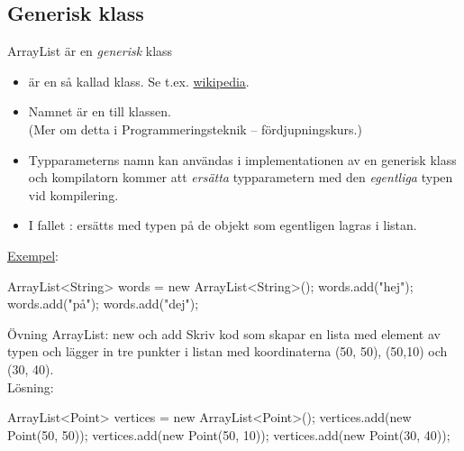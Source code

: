 \documentclass{lecturenotes}
\begin{document}
\subsection{Generisk klass}
\begin{Slide}{ArrayList är en \emph{generisk} klass}\footnotesize
\begin{itemize}
\item {} är en så kallad   klass. Se t.ex. \href{https://en.wikipedia.org/wiki/Generics_in_Java}{wikipedia}.
\item Namnet  är en  till klassen. \\(Mer om detta i Programmeringsteknik – fördjupningskurs.)
\item Typparameterns namn kan användas i implementationen av en generisk klass och kompilatorn kommer att \emph{ersätta} typparametern med den \emph{egentliga} typen vid kompilering.
\item I fallet :  ersätts med typen på de objekt som egentligen lagras i listan.  
\end{itemize}
\href{https://github.com/bjornregnell/lth-eda016-2015/blob/master/lectures/examples/eclipse-ws/lecture-examples/src/week10/generics/TestGenerics.java}{Exempel}:
\begin{Code}[numberstyle=]
        ArrayList<String> words = new ArrayList<String>();
        words.add("hej");
        words.add("på");
        words.add("dej");
\end{Code}
\end{Slide}

\begin{Slide}{Övning ArrayList: new och add}
Skriv kod som skapar en lista med element av typen  och lägger in tre punkter i listan med koordinaterna (50, 50), (50,10) och (30, 40).
\pause
\\\vspace{1em} Lösning: \\\vspace{1em} 
\begin{Code}[numberstyle=]
ArrayList<Point> vertices = new ArrayList<Point>(); 
vertices.add(new Point(50, 50));
vertices.add(new Point(50, 10)); 
vertices.add(new Point(30, 40)); 
\end{Code}


\end{Slide}
\end{document}
